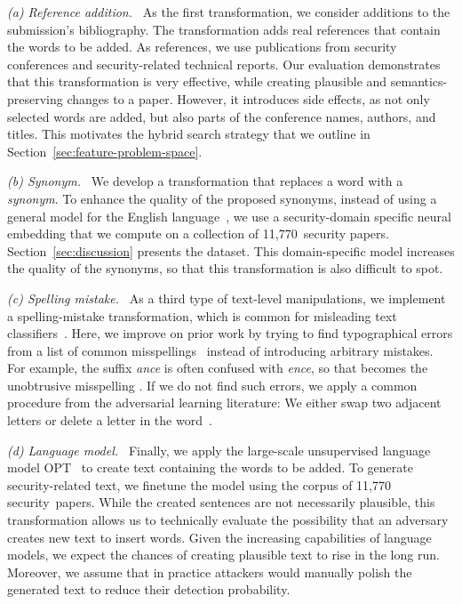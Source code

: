 \documentclass[letterpaper,twocolumn,10pt]{article}
\newcommand{\eg}{e.\,g.}
\begin{document}
\newcommand{\minipara}[1]{\emph{#1~}}

\minipara{(a) Reference addition.}
As the first transformation, we consider additions to the submission's bibliography. The transformation adds real references that contain the words to be added. As references, we use publications from security conferences and security-related technical reports. Our evaluation demonstrates that this transformation is very effective, while creating plausible and semantics-preserving changes to a paper. However, it introduces side effects, as not only selected words are added, but also parts of the conference names, authors, and titles. This motivates the hybrid search strategy that we outline in Section~\ref{sec:feature-problem-space}.

\minipara{(b) Synonym.}
We develop a transformation that replaces a word with a \emph{synonym}. To enhance the quality of the proposed synonyms, instead of using a general model for the English language~\mbox{\cite[\eg][]{li-19-textbugger, jin-20-bert, ren-19-generating}}, we use a security-domain specific neural embedding that we compute on a collection of 11,770~security papers. Section~\ref{sec:discussion} presents the dataset. This domain-specific model increases the quality of the synonyms, so that this transformation is also difficult to spot.

\minipara{(c) Spelling mistake.}
As a third type of text-level manipulations, we implement a spelling-mistake transformation, which is common for misleading text classifiers~\cite{gao-18-blackbox, liu-20-joint}. Here, we improve on prior work by trying to find typographical errors from a list of common misspellings~\cite{misc-mispellings} instead of introducing arbitrary mistakes.
For example, the suffix \emph{ance} is often confused with \emph{ence}, so that  becomes the unobtrusive misspelling . If we do not find such errors, we apply a common procedure from the adversarial learning literature: We either swap two adjacent letters or delete a letter in the word~\cite{li-19-textbugger, gao-18-blackbox, liu-20-joint}. 

\minipara{(d) Language model.} Finally, we apply the large-scale unsupervised language model \mbox{OPT}~\cite{zhang-22-opt} to create text containing the words to be added. To generate security-related text, we finetune the model using the corpus of 11,770 security~papers. While the created sentences are not necessarily plausible, this transformation allows us to technically evaluate the possibility that an adversary creates new text to insert words. Given the increasing capabilities of language models, we expect the chances of creating plausible text to rise in the long run. Moreover, we assume that in practice attackers would manually polish the generated text to reduce their detection probability.
\end{document}
